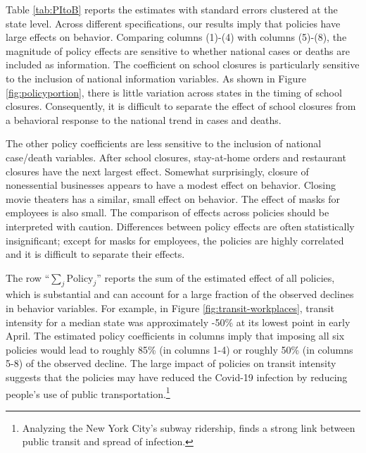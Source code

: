 \documentclass[11pt,reqno,letter]{amsart}
\theoremstyle{definition}
\begin{document}
Table \ref{tab:PItoB} reports the estimates with standard errors clustered at the state level.  Across different
specifications, our results imply that policies have large effects on
behavior. Comparing columns (1)-(4) with columns (5)-(8),
the magnitude of policy effects are sensitive to whether national
cases or deaths are included as information. The coefficient on school
closures is particularly sensitive to the inclusion of national
information variables.  As shown in Figure
\ref{fig:policyportion}, there is little variation across states in
the timing of school closures. Consequently, it is difficult to
separate the effect of school closures from a behavioral response to the national
trend in cases and deaths.

The other policy coefficients are less sensitive to the inclusion of
national case/death variables. After school closures, stay-at-home
orders and restaurant closures have the next largest effect. Somewhat
surprisingly, closure of nonessential businesses appears to have
a modest effect on behavior. Closing movie theaters has a similar,
small effect on behavior. The effect of masks for employees is also
small. The comparison of effects across policies should be interpreted
with caution.  Differences between policy effects are often
statistically insignificant; except for masks for employees, the
policies are highly correlated and it is difficult to separate their
effects.


The row ``$\sum_j \mathrm{Policy}_j$'' reports the sum of the estimated
effect of all policies, which is substantial and can account for a
large fraction of the observed declines in behavior variables.  For
example,  in Figure \ref{fig:transit-workplaces}, transit intensity for a median state was approximately -50\% at its lowest point
 in early April. The estimated policy coefficients in columns imply
that imposing all six policies would lead to roughly 85\% (in columns
1-4) or roughly 50\% (in columns 5-8) of the observed decline. The large impact of policies on transit intensity suggests that the policies may have reduced the Covid-19 infection by reducing people's use of public transportation.\footnote{Analyzing the New York City's subway ridership,  \cite{NBERw27021} finds  a strong link between public transit and spread of infection.}


\end{document}
